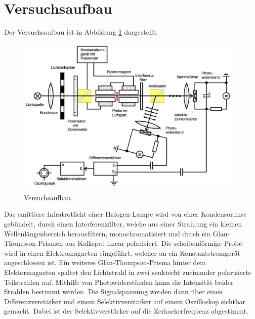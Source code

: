 \section{Versuchsaufbau}
Der Versuchsaufbau ist in Abbildung \ref{fig:aufbau} dargestellt.
\begin{figure}
    \centering
    \includegraphics[scale = 0.4]{aufbau.png}
    \caption{Versuchsaufbau.\cite{1}}
    \label{fig:aufbau}
  \end{figure}
 \newline
Das emittiere Infratrotlicht einer Halogen-Lampe wird von einer Kondensorlinse gebündelt,
durch einen Interferenzfilter, welche aus einer Strahlung ein kleinen Wellenlängenbereich herausfiltern,
monochromatisiert und durch ein Glan-Thompson-Prismen aus Kalkspat linear polarisiert.
Die scheibenförmige Probe wird in einen Elektromagneten eingeführt, welcher an ein Konstantstromgerät
angeschlossen ist. Ein weiteres Glan-Thompson-Prisma hinter dem Elektormagneten spaltet den Lichtstrahl
in zwei senktecht zueinander polarisierte Teilstrahlen auf. Mithilfe von Photowiderständen kann die Intensität
beider Strahlen bestimmt werden. Die Signalspannung werden dann über einen Differenzverstärker und einem
Selektivverstärker auf einem Oszilloskop sichtbar gemacht. Dabei ist der Selektivverstärker auf die
Zerhackerfrequenz abgestimmt.
